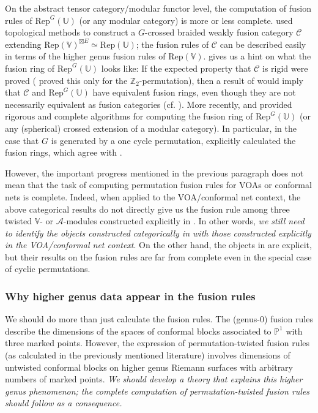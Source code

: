 \documentclass[12pt,a4paper,notitlepage]{article}
\theoremstyle{definition}
\theoremstyle{plain}
\newcommand{\mc}{\mathcal}
\newcommand{\Rep}{\mathrm{Rep}}
\newcommand{\scr}{\mathscr}
\newcommand{\mbb}{\mathbb}
\newcommand{\Vbb}{\mathbb V}
\newcommand{\Ubb}{\mathbb U}
\newcommand{\Zbb}{\mathbb Z}
\newcommand{\Pbb}{\mathbb P}
\numberwithin{equation}{subsection}
\begin{document}
On the abstract tensor category/modular functor level, the computation of fusion rules of $\Rep^G(\Ubb)$ (or any modular category) is more or less complete. \cite{BS11} used topological methods to construct a $G$-crossed  braided weakly fusion category $\scr C$ extending $\Rep(\Vbb)^{\boxtimes E}\simeq\Rep(\Ubb)$;  the fusion rules of $\scr C$ can be described easily in terms of the higher genus fusion rules of $\Rep(\Vbb)$. \cite{BS11} gives us a hint on what the fusion ring of $\Rep^G(\Ubb)$ looks like: If the expected property that $\scr C$ is rigid were proved (\cite{BS11} proved this only for the $\Zbb_2$-permutation), then a result of \cite{ENO10} would imply that $\scr C$ and $\Rep^G(\Ubb)$ have equivalent fusion rings, even though they are not necessarily equivalent as fusion categories (cf. \cite{Bis20,EG18}).
More recently, \cite{BJ19} and \cite{Del19} provided rigorous and complete algorithms for computing the fusion ring of $\Rep^G(\Ubb)$ (or any (spherical) crossed extension of a modular category). In particular, in the case that $G$ is generated by a one cycle permutation, \cite{BJ19} explicitly calculated the fusion rings, which agree with \cite{BS11}.


However, the important progress mentioned in the previous paragraph does not mean that the task of computing permutation fusion rules for VOAs or conformal nets is complete. Indeed,  when applied to the VOA/conformal net context, the above categorical results do not directly give us the fusion rule among three twisted $\Vbb$- or $\mc A$-modules constructed explicitly in \cite{BDM02,LX04,KLX05}.  In other words, \textit{we still need to identify the objects constructed categorically in \cite{BS11,BJ19,Del19} with those constructed explicitly in the VOA/conformal net context}. On the other hand, the objects in \cite{LX04,KLX05,DLXY19} are explicit, but their results on the fusion rules are  far from complete even in the special case of cyclic permutations.




\subsubsection*{Why higher genus data appear in the fusion rules}


We should do more than just calculate the fusion rules. The (genus-$0$) fusion rules describe the dimensions of the spaces of conformal blocks associated to $\Pbb^1$ with three marked points. However, the expression of permutation-twisted fusion rules (as calculated in the previously mentioned literature) involves dimensions of untwisted conformal blocks on higher genus Riemann surfaces with arbitrary numbers of marked points. \textit{We should develop a theory that explains this higher genus phenomenon; the complete computation of permutation-twisted fusion rules should follow as a consequence.}
\end{document}
